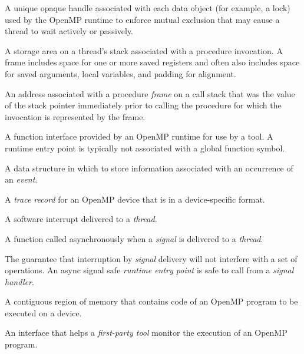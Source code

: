 \glossarydefstart
A unique opaque handle associated with each data object (for example, a lock) 
used by the OpenMP runtime to enforce mutual exclusion that may cause a thread 
to wait actively or passively.
\glossarydefend

\glossarydefstart
A storage area on a thread's stack associated with a procedure invocation. 
A frame includes space for one or more saved registers and often also 
includes space for saved arguments, local variables,
and padding for alignment.
\glossarydefend

\glossarydefstart
An address associated with a procedure \emph{frame} on a call stack that 
was the value of the stack pointer immediately prior to calling the procedure 
for which the invocation is represented by the frame.
\glossarydefend

\glossarydefstart
A function interface provided by an OpenMP runtime for use by a tool. 
A runtime entry point is typically not associated with a global function symbol.
\glossarydefend

\glossarydefstart
A data structure in which to store information associated with an 
occurrence of an \emph{event}.
\glossarydefend

\glossarydefstart
A \emph{trace record} for an OpenMP device that is in a device-specific format.
\glossarydefend

\glossarydefstart
A software interrupt delivered to a \emph{thread}.
\glossarydefend

\glossarydefstart
A function called asynchronously when a \emph{signal} is delivered to 
a \emph{thread}.
\glossarydefend

\glossarydefstart
The guarantee that interruption by \emph{signal} delivery will not
interfere with a set of operations.
An async signal safe \emph{runtime entry point} is safe to call 
from a \emph{signal handler}.
\glossarydefend

\glossarydefstart
A contiguous region of memory that contains code of an OpenMP program 
to be executed on a device.
\glossarydefend


\glossarydefstart
An interface that helps a \emph{first-party tool} monitor the execution 
of an OpenMP program.
\glossarydefend

